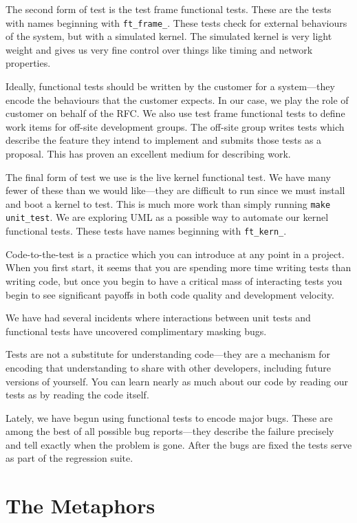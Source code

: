 \documentclass[twocolumn]{article}
\begin{document}
The second form of test is the test frame functional tests.  These are
the tests with names beginning with \texttt{ft\_frame\_}.  These tests
check for external behaviours of the system, but with a simulated
kernel.  The simulated kernel is very light weight and gives us very
fine control over things like timing and network properties.

Ideally, functional tests should be written by the customer for a
system---they encode the behaviours that the customer expects.  In our
case, we play the role of customer on behalf of the RFC.  We also use
test frame functional tests to define work items for off-site
development groups.  The off-site group writes tests which describe the 
feature they intend to implement and submits those tests as a
proposal.  This has proven an excellent medium for describing work.

The final form of test we use is the live kernel functional test.  We
have many fewer of these than we would like---they are difficult to run 
since we must install and boot a kernel to test.  This is much more
work than simply running \texttt{make unit\_test}. We are exploring UML as 
a possible way to automate our kernel functional tests.  These tests
have names beginning with \texttt{ft\_kern\_}.

Code-to-the-test is a practice which you can introduce at any point in 
a project.  When you first start, it seems that you are spending more
time writing tests than writing code, but once you begin to have a
critical mass of interacting tests you begin to see significant
payoffs in both code quality and development velocity.

We have had several incidents where interactions between unit tests
and functional tests have uncovered complimentary masking bugs.

Tests are not a substitute for understanding code---they are a
mechanism for encoding that understanding to share with other
developers, including future versions of yourself.  You can learn
nearly as much about our code by reading our tests as by reading the
code itself.

Lately, we have begun using functional tests to encode major bugs.
These are among the best of all possible bug reports---they describe
the failure precisely and tell exactly when the problem is gone.
After the bugs are fixed the tests serve as part of the regression
suite.

\section{The Metaphors}
\end{document}
